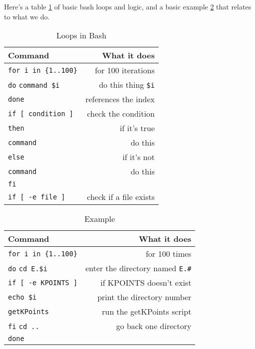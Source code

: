 \documentclass{article}
\begin{document}
Here's a table \ref{bashloops} of basic bash loops and logic, and a
basic example \ref{loopexample} that relates to what we do.

\begin{table}
        \begin{center}
                \caption{Loops in Bash}
                \label{bashloops}
                \begin{tabular}{l|r}
                  \textbf{Command} & \textbf{What it does}\\
                  \hline
                  \verb|for i in {1..100}| & for 100 iterations\\
                  \verb|do|
                  \verb|command $i| & do this thing \verb|$i| \\
                  \verb|done| & references the index \\
                  \hline
                  \verb|if [ condition ]| & check the condition \\
                  \verb|then| & if it's true \\
                  \verb|command| & do this \\
                  \verb|else| & if it's not \\
                  \verb|command| & do this \\
                  \verb|fi| & \\
                  \hline
                  \verb|if [ -e file ] |& check if a file exists \\
                 \end{tabular}
        \end{center}
      \end{table}
      
\begin{table}
        \begin{center}
                \caption{Example}
                \label{loopexample}
                \begin{tabular}{l|r}
                  \textbf{Command} & \textbf{What it does}\\
                  \hline
                  \verb|for i in {1..100}| & for 100 times \\
                  \verb|do|
                  \verb|cd E.$i| & enter the directory named
                                   \verb|E.#|\\
                  \verb|if [ -e KPOINTS ]| & if KPOINTS doesn't exist
                  \\
                  \verb|echo $i| & print the directory number \\
                  \verb|getKPoints| & run the getKPoints script \\
                  \verb|fi|
                  \verb|cd ..| & go back one directory \\
                  \verb|done|
                 \end{tabular}
        \end{center}
\end{table}
\end{document}
